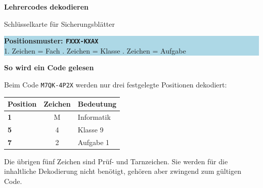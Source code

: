 \documentclass[10pt,a4paper]{article}
\newcommand{\sectiontitle}[1]{%
  \vspace{3pt}%
  {\large\bfseries\color{Navy}#1}\par
  \vspace{2pt}%
}
\begin{document}
{\LARGE\bfseries\color{Navy} Lehrercodes dekodieren}\par
\vspace{2pt}
{\normalsize\color{Muted}Schlüsselkarte für Sicherungsblätter}\par

\vspace{8pt}
\colorbox{LightBlue}{%
  \parbox{\dimexpr\textwidth-2\fboxsep\relax}{%
    \textbf{\color{Navy}Positionsmuster: \texttt{FXXX-KXAX}}\\[3pt]
    1. Zeichen = Fach . Zeichen = Klasse . Zeichen = Aufgabe
  }%
}

\sectiontitle{So wird ein Code gelesen}

Beim Code \texttt{M7QK-4P2X} werden nur drei festgelegte Positionen
dekodiert:

\begin{center}
\begin{tabular}{>{\bfseries}l c l}
\toprule
Position & Zeichen & Bedeutung \\
\midrule
1 & M & Informatik \\
5 & 4 & Klasse 9 \\
7 & 2 & Aufgabe 1 \\
\bottomrule
\end{tabular}
\end{center}

Die übrigen fünf Zeichen sind Prüf- und Tarnzeichen. Sie werden für die
inhaltliche Dekodierung nicht benötigt, gehören aber zwingend zum gültigen
Code.
\end{document}
